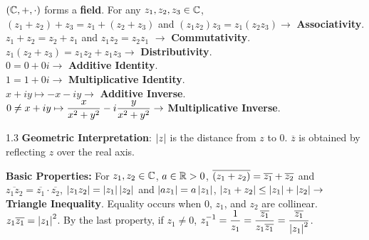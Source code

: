 \documentclass{article}
\newcommand{\framethis}[2][1.3]{
  \begin{framed}
    \begin{spacing}{#1}
      #2
    \end{spacing}
  \end{framed}
}
\begin{document}
  \begin{framed}\begin{spacing}{1.4}
    $\left({\mathbb C}, +, \cdot\right)$ forms a \textbf{field}. For any $z_1, z_2, z_3
    \in {\mathbb C}$, \\
    $(z_1+z_2)+z_3 = z_1+(z_2+z_3)$ and $(z_1z_2)z_3 = z_1(z_2z_3) \rightarrow$ \textbf{Associativity}. \\
    $z_1+z_2 = z_2+z_1$ and $z_1z_2 = z_2z_1$ $\rightarrow$ \textbf{Commutativity}. \\
    $z_1(z_2+z_3) = z_1z_2 + z_1z_3 \rightarrow$ \textbf{Distributivity}. \\
    $0 = 0 + 0i \rightarrow$ \textbf{Additive Identity}. \\
    $1 = 1 + 0i \rightarrow$ \textbf{Multiplicative Identity}. \\
    $x+iy \mapsto -x-iy \rightarrow$ \textbf{Additive Inverse}. \\
    $\displaystyle 0 \neq x+iy \mapsto \frac{x}{x^2+y^2} -i\frac{y}{x^2+y^2} \rightarrow$ \textbf{Multiplicative Inverse}.
  \end{spacing}
  \end{framed}


  
  \framethis{\textbf{Geometric Interpretation}: $\left|z\right|$ is the distance from 
  $z$ to 0. $\overline{z}$ is obtained by reflecting $z$ over the real axis.}

  \framethis[]{\textbf{Basic Properties:} For $z_1,z_2 \in {\mathbb C}$, $a \in {\mathbb R} > 0$,\el
  $\displaystyle \overline{(z_1+z_2)} = \overline{z_1}+\overline{z_2}$ and $\overline{z_1z_2} = \overline{z_1} \cdot \overline{z_2}$,\el
  $\left|z_1z_2\right| = \left|z_1\right|\left|z_2\right|$ and $\left|az_1\right| = a\left|z_1\right|$,\el
  $\left|z_1+z_2\right| \leq \left|z_1\right|+\left|z_2\right| \rightarrow$ \textbf{Triangle Inequality}. Equality occurs when $0$, $z_1$, and $z_2$ are collinear.\el
  $z_1\overline{z_1} = \left|z_1\right|^2$.\el
  By the last property, if $z_1 \neq 0$, $\displaystyle z_1^{-1} = \frac{1}{z_1} = \frac{\overline{z_1}}{z_1\overline{z_1}} = \frac{\overline{z_1}}{\left|z_1\right|^2}$.}

\end{document}
